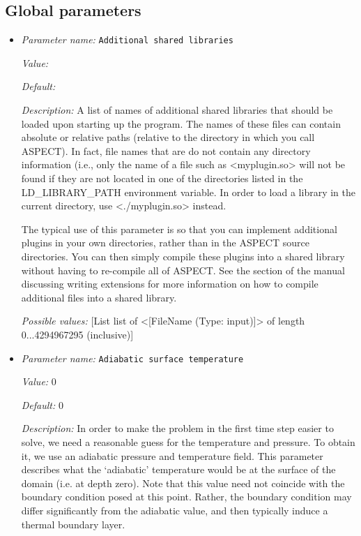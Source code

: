 \subsection{Global parameters}
\label{parameters:global}


\begin{itemize}
\item {\it Parameter name:} {\tt Additional shared libraries}


{\it Value:} 


{\it Default:} 


{\it Description:} A list of names of additional shared libraries that should be loaded upon starting up the program. The names of these files can contain absolute or relative paths (relative to the directory in which you call ASPECT). In fact, file names that are do not contain any directory information (i.e., only the name of a file such as <myplugin.so> will not be found if they are not located in one of the directories listed in the LD_LIBRARY_PATH environment variable. In order to load a library in the current directory, use <./myplugin.so> instead.

The typical use of this parameter is so that you can implement additional plugins in your own directories, rather than in the ASPECT source directories. You can then simply compile these plugins into a shared library without having to re-compile all of ASPECT. See the section of the manual discussing writing extensions for more information on how to compile additional files into a shared library.


{\it Possible values:} [List list of <[FileName (Type: input)]> of length 0...4294967295 (inclusive)]
\item {\it Parameter name:} {\tt Adiabatic surface temperature}


{\it Value:} 0


{\it Default:} 0


{\it Description:} In order to make the problem in the first time step easier to solve, we need a reasonable guess for the temperature and pressure. To obtain it, we use an adiabatic pressure and temperature field. This parameter describes what the `adiabatic' temperature would be at the surface of the domain (i.e. at depth zero). Note that this value need not coincide with the boundary condition posed at this point. Rather, the boundary condition may differ significantly from the adiabatic value, and then typically induce a thermal boundary layer.


\end{itemize}
